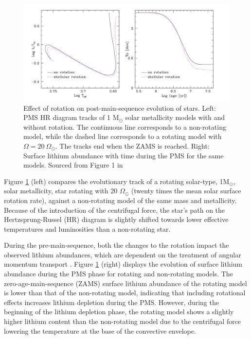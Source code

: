 \begin{figure}[h]
    \includegraphics[width=\textwidth]{Figures/intro_figures/PMS_effect.png}
    \caption[Effect of rotation on pre-main-sequence evolution of a 1 $M_{\odot}$ star.]{Effect of rotation on post-main-sequence evolution of stars. Left: PMS HR diagram tracks of 1 M$_{\odot}$ solar metallicity models with and without rotation. The continuous line corresponds to a non-rotating model, while the dashed line corresponds to a rotating model with $\Omega = 20 \ \Omega_{\odot}$. The tracks end when the ZAMS is reached. Right: Surface lithium abundance with time during the PMS for the same models. Sourced from Figure 1 in \citet{eggenberger_rotation_2013}}
    \label{fig:pms_effect}
\end{figure}

Figure \ref{fig:pms_effect} (left) compares the evolutionary track of a rotating solar-type, 1M$_{\odot}$, solar metallicity, star rotating with 20 $\Omega_{\odot}$ (twenty times the mean solar surface rotation rate), against a non-rotating model of the same mass and metallicity. 
Because of the introduction of the centrifugal force, the star's path on the Hertzsprung-Russel (HR) diagram is slightly shifted towards lower effective temperatures and luminosities than a non-rotating star.

During the pre-main-sequence, both the changes to the rotation impact the observed lithium abundances, which are dependent on the treatment of angular momentum transport \citep{dumont_lithium_2021}.
Figure \ref{fig:pms_effect} (right) displays the evolution of surface lithium abundance during the PMS phase for rotating and non-rotating models. 
The zero-age-main-sequence (ZAMS) surface lithium abundance of the rotating model is lower than that of the non-rotating model, indicating that including rotational effects increases lithium depletion during the PMS. 
However, during the beginning of the lithium depletion phase, the rotating model shows a slightly higher lithium content than the non-rotating model due to the centrifugal force lowering the temperature at the base of the convective envelope.

